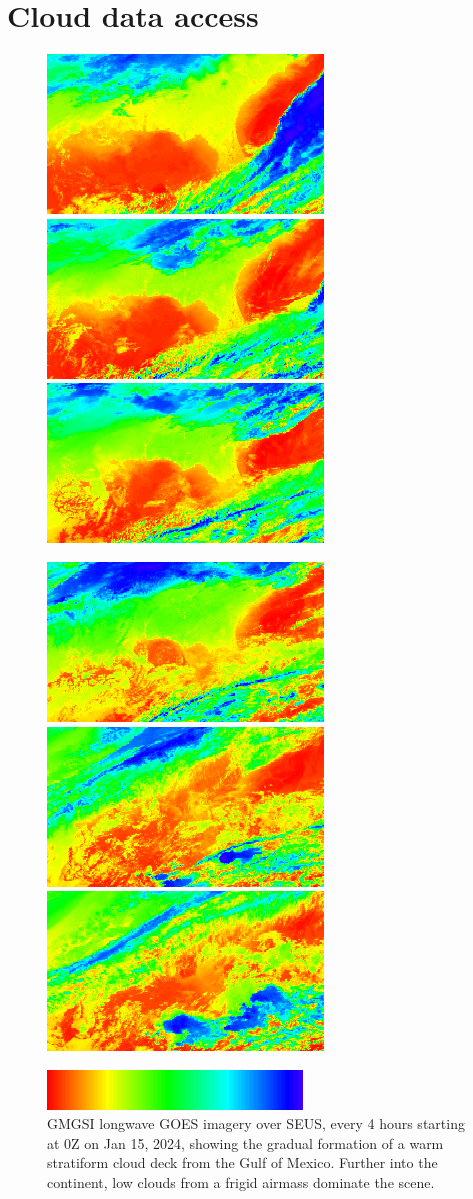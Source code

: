 \documentclass[11pt]{article}
\begin{document}
\section{Cloud data access}

\begin{figure}[h!]
    \centering
    \includegraphics[width=.3\linewidth]{figs/goes_0.png}
    \includegraphics[width=.3\linewidth]{figs/goes_4.png}
    \includegraphics[width=.3\linewidth]{figs/goes_8.png}

    \vspace{.25em}

    \includegraphics[width=.3\linewidth]{figs/goes_12.png}
    \includegraphics[width=.3\linewidth]{figs/goes_16.png}
    \includegraphics[width=.3\linewidth]{figs/goes_20.png}

    \vspace{.25em}

    \includegraphics[width=.4\linewidth]{figs/cbar.png}

    \caption{GMGSI longwave GOES imagery over SEUS, every 4 hours starting at 0Z on Jan 15, 2024, showing the gradual formation of a warm stratiform cloud deck from the Gulf of Mexico. Further into the continent, low clouds from a frigid airmass dominate the scene.}
\end{figure}
\end{document}
